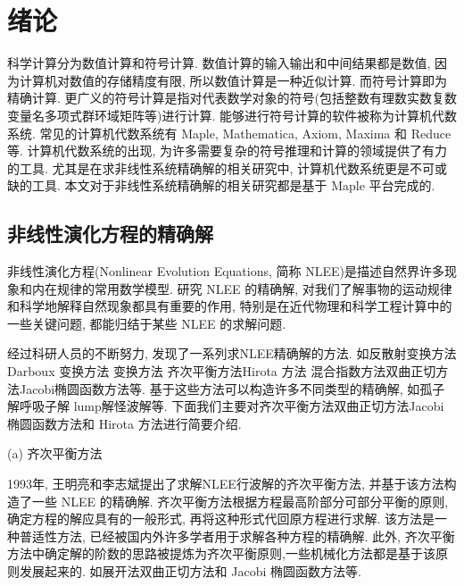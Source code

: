 \chapter{绪论} \label{ch01}
科学计算分为数值计算和符号计算. 数值计算的输入输出和中间结果都是数值, 因为计算机对数值的存储精度有限, 所以数值计算是一种近似计算. 而符号计算即为精确计算. 更广义的符号计算是指对代表数学对象的符号(包括整数\D 有理数\D 实数\D 复数\D 变量名\D 多项式\D 群\D 环\D 域\D 矩阵等)进行计算. 能够进行符号计算的软件被称为计算机代数系统. 常见的计算机代数系统有 Maple, Mathematica, Axiom, Maxima 和 Reduce 等. 计算机代数系统的出现, 为许多需要复杂的符号推理和计算的领域提供了有力的工具. 尤其是在求非线性系统精确解的相关研究中, 计算机代数系统更是不可或缺的工具. 本文对于非线性系统精确解的相关研究都是基于 Maple 平台完成的. 

\section{非线性演化方程的精确解}
非线性演化方程(Nonlinear Evolution Equations, 简称 NLEE)是描述自然界许多现象和内在规律的常用数学模型. 研究 NLEE 的精确解, 对我们了解事物的运动规律和科学地解释自然现象都具有重要的作用, 特别是在近代物理和科学工程计算中的一些关键问题, 都能归结于某些 NLEE 的求解问题. 

经过科研人员的不断努力, 发现了一系列求NLEE精确解的方法. 如反散射变换方法\cite{kawata1978inverse}\D Darboux 变换方法 \cite{matveev1991darboux}\D \Backlund{}变换方法 \cite{wahlquist1973backlund}\D 齐次平衡方法\cite{zhibin1993travelling}\D Hirota 方法 \cite{hirota1971exact}\D 混合指数方法\cite{hereman1986exact}\D 双曲正切方法\cite{malfliet1992solitary}\D Jacobi椭圆函数方法\cite{liu2001jacobi}等. 基于这些方法可以构造许多不同类型的精确解, 如孤子解\cite{hirota1971exact}\D 呼吸子解 \cite{tajiri1989breather}\D lump解\cite{satsuma1979two}\D 怪波解\cite{guo2011rogue}等. 下面我们主要对齐次平衡方法\D 双曲正切方法\D Jacobi 椭圆函数方法和 Hirota 方法进行简要介绍. 

(a) 齐次平衡方法

1993年, 王明亮和李志斌\cite{zhibin1993travelling}提出了求解NLEE行波解的齐次平衡方法, 并基于该方法构造了一些 NLEE 的精确解\cite{wang1995solitary,wang1996application}. 齐次平衡方法根据方程最高阶部分可部分平衡的原则, 确定方程的解应具有的一般形式, 再将这种形式代回原方程进行求解. 该方法是一种普适性方法, 已经被国内外许多学者用于求解各种方程的精确解\cite{hbm1998,senthilvelan2001extended,zhao2002new,rady2010homogeneous,nguyen2015modified}. 此外, 齐次平衡方法中确定解的阶数的思路被提炼为齐次平衡原则,一些机械化方法都是基于该原则发展起来的. 如\Painleve{}展开法\D 双曲正切方法和 Jacobi 椭圆函数方法等. 

